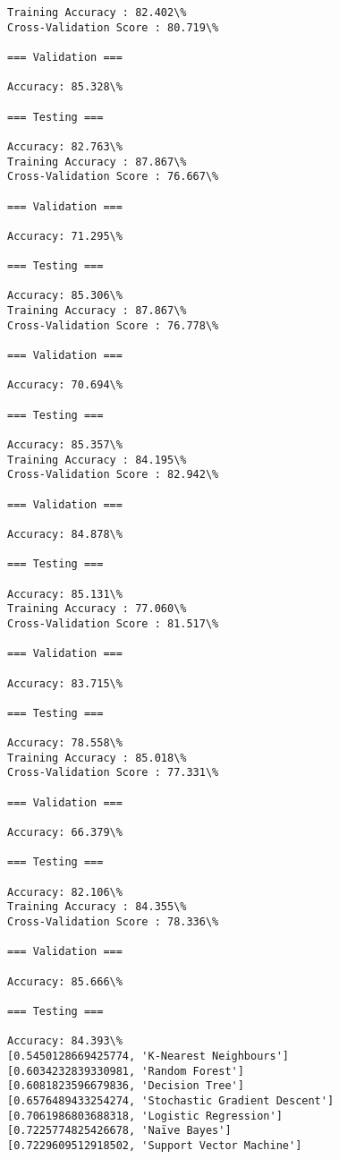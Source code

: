 \documentclass[11pt]{article}
\begin{document}
    \begin{Verbatim}[commandchars=\\\{\}]
Training Accuracy : 82.402\%
Cross-Validation Score : 80.719\%

=== Validation ===

Accuracy: 85.328\%

=== Testing ===

Accuracy: 82.763\%
Training Accuracy : 87.867\%
Cross-Validation Score : 76.667\%

=== Validation ===

Accuracy: 71.295\%

=== Testing ===

Accuracy: 85.306\%
Training Accuracy : 87.867\%
Cross-Validation Score : 76.778\%

=== Validation ===

Accuracy: 70.694\%

=== Testing ===

Accuracy: 85.357\%
Training Accuracy : 84.195\%
Cross-Validation Score : 82.942\%

=== Validation ===

Accuracy: 84.878\%

=== Testing ===

Accuracy: 85.131\%
Training Accuracy : 77.060\%
Cross-Validation Score : 81.517\%

=== Validation ===

Accuracy: 83.715\%

=== Testing ===

Accuracy: 78.558\%
Training Accuracy : 85.018\%
Cross-Validation Score : 77.331\%

=== Validation ===

Accuracy: 66.379\%

=== Testing ===

Accuracy: 82.106\%
Training Accuracy : 84.355\%
Cross-Validation Score : 78.336\%

=== Validation ===

Accuracy: 85.666\%

=== Testing ===

Accuracy: 84.393\%
[0.5450128669425774, 'K-Nearest Neighbours']
[0.6034232839330981, 'Random Forest']
[0.6081823596679836, 'Decision Tree']
[0.6576489433254274, 'Stochastic Gradient Descent']
[0.7061986803688318, 'Logistic Regression']
[0.7225774825426678, 'Naïve Bayes']
[0.7229609512918502, 'Support Vector Machine']

    \end{Verbatim}
\end{document}
